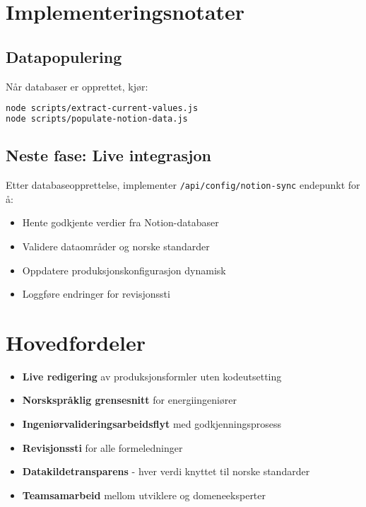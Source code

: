 \documentclass[11pt,a4paper]{article}
\begin{document}
\section{Implementeringsnotater}

\subsection{Datapopulering}
Når databaser er opprettet, kjør:

\begin{lstlisting}[language=bash, backgroundcolor=\color{gray!10}]
node scripts/extract-current-values.js
node scripts/populate-notion-data.js
\end{lstlisting}

\subsection{Neste fase: Live integrasjon}
Etter databaseopprettelse, implementer \texttt{/api/config/notion-sync} endepunkt for å:

\begin{itemize}[leftmargin=*]
    \item Hente godkjente verdier fra Notion-databaser
    \item Validere dataområder og norske standarder
    \item Oppdatere produksjonskonfigurasjon dynamisk
    \item Loggføre endringer for revisjonssti
\end{itemize}

\section{Hovedfordeler}

\begin{tcolorbox}[colback=warningorange!10,colframe=warningorange,title=Nøkkelfordeler]
\begin{itemize}[leftmargin=*]
    \item \textbf{Live redigering} av produksjonsformler uten kodeutsetting
    \item \textbf{Norskspråklig grensesnitt} for energiingeniører
    \item \textbf{Ingeniørvalideringsarbeidsflyt} med godkjenningsprosess
    \item \textbf{Revisjonssti} for alle formeledninger
    \item \textbf{Datakildetransparens} - hver verdi knyttet til norske standarder
    \item \textbf{Teamsamarbeid} mellom utviklere og domeneeksperter
\end{itemize}
\end{tcolorbox}
\end{document}
